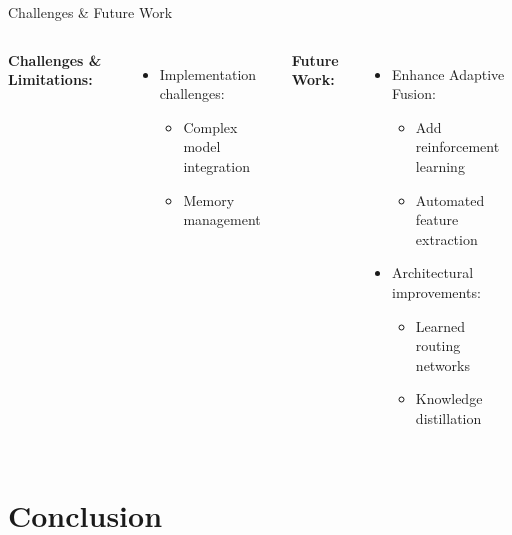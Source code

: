 \documentclass{beamer}
\begin{document}
\begin{frame}{Challenges \& Future Work}
\begin{columns}[T]
\textbf{Challenges \& Limitations:}
\begin{itemize}
    \item Implementation challenges:
    \begin{itemize}
        \item Complex model integration
        \item Memory management
    \end{itemize}
\end{itemize}

\textbf{Future Work:}
\begin{itemize}
    \item Enhance Adaptive Fusion:
    \begin{itemize}
        \item Add reinforcement learning
        \item Automated feature extraction
    \end{itemize}
    \item Architectural improvements:
    \begin{itemize}
        \item Learned routing networks
        \item Knowledge distillation
    \end{itemize}
\end{itemize}
\end{columns}
\end{frame}

\section{Conclusion}
\end{document}
